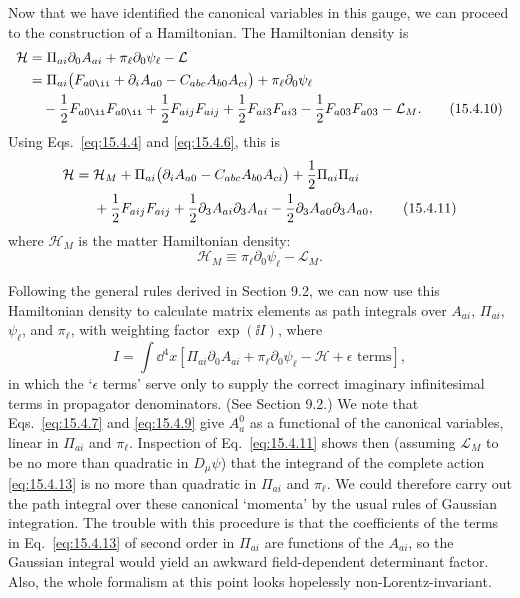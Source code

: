 Now that we have identified the canonical variables in this gauge, we can
proceed to the construction of a Hamiltonian. The Hamiltonian density is
\begin{align}
  \mathcal H
  &=\Pi_{a i}\partial_0A_{a i}
  +\pi_\ell\partial_0\psi_\ell-\mathcal L
  \notag\\
 &=\Pi_{a i}\bigl(F_{a0\ii}+\partial_iA_{a0}
 -C_{abc}A_{b0}A_{c i}\bigr)
  +\pi_\ell\partial_0\psi_\ell
  \notag\\
  &\quad-\frac12F_{a0\ii}F_{a0\ii}
  +\frac12F_{a ij}F_{a ij}
  +\frac12F_{a i3}F_{a i3}
  -\frac12F_{a03}F_{a03}-\mathcal L_M.
  \tag{15.4.10}\label{eq:15.4.10}
\end{align}
Using Eqs.~\eqref{eq:15.4.4} and \eqref{eq:15.4.6}, this is
\begin{align}
  \mathcal H={}&\mathcal H_M
 +\Pi_{a i}\bigl(\partial_iA_{a0}
 -C_{abc}A_{b0}A_{c i}\bigr)
  +\frac12\Pi_{a i}\Pi_{a i}
  \notag\\
  &+\frac12F_{a ij}F_{a ij}
  +\frac12\partial_3A_{a i}\partial_3A_{a i}
  -\frac12\partial_3A_{a0}\partial_3A_{a0},
  \tag{15.4.11}\label{eq:15.4.11}
\end{align}
where $\mathcal H_M$ is the matter Hamiltonian density:
\begin{equation}
  \mathcal H_M\equiv\pi_\ell\partial_0\psi_\ell-\mathcal L_M.
  \tag{15.4.12}\label{eq:15.4.12}
\end{equation}

Following the general rules derived in Section 9.2, we can now use this
Hamiltonian density to calculate matrix elements as path integrals over
$A_{a i}$, $\Pi_{a i}$, $\psi_\ell$, and $\pi_\ell$, with weighting
factor $\exp(\ii I)$, where
\begin{equation}
  I=\int \dd^4x\left[\Pi_{a i}\partial_0A_{a i}
  +\pi_\ell\partial_0\psi_\ell-\mathcal H+\epsilon\text{ terms}\right],
  \tag{15.4.13}\label{eq:15.4.13}
\end{equation}
in which the `$\epsilon$ terms' serve only to supply the correct imaginary
infinitesimal terms in propagator denominators. (See Section 9.2.) We note that
Eqs.~\eqref{eq:15.4.7} and \eqref{eq:15.4.9} give $A_a^0$ as a
functional of the canonical variables, linear in $\Pi_{a i}$ and
$\pi_\ell$. Inspection of Eq.~\eqref{eq:15.4.11} shows then (assuming
$\mathcal L_M$ to be no more than quadratic in $D_\mu\psi$) that the integrand
of the complete action \eqref{eq:15.4.13} is no more than quadratic in
$\Pi_{a i}$ and $\pi_\ell$. We could therefore carry out the path
integral over these canonical `momenta' by the usual rules of Gaussian
integration. The trouble with this procedure is that the coefficients of the
terms in Eq.~\eqref{eq:15.4.13} of second order in $\Pi_{a i}$ are
functions of the $A_{a i}$, so the Gaussian integral would yield an
awkward field-dependent determinant factor. Also, the whole formalism at this
point looks hopelessly non-Lorentz-invariant.

